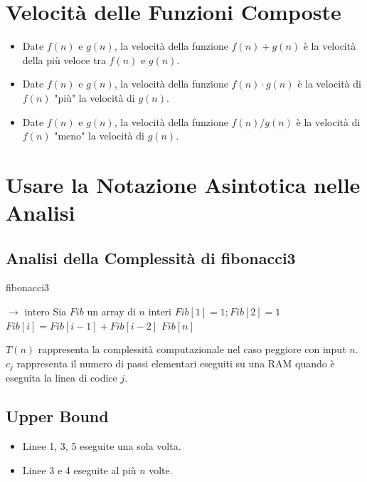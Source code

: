 \documentclass{article}
\begin{document}
\section{Velocità delle Funzioni Composte}

\begin{itemize}
    \item Date $f(n)$ e $g(n)$, la velocità della funzione $f(n) + g(n)$ è la velocità della più veloce tra $f(n)$ e $g(n)$.
    \item Date $f(n)$ e $g(n)$, la velocità della funzione $f(n) \cdot g(n)$ è la velocità di $f(n)$ "più" la velocità di $g(n)$.
    \item Date $f(n)$ e $g(n)$, la velocità della funzione $f(n) / g(n)$ è la velocità di $f(n)$ "meno" la velocità di $g(n)$.
\end{itemize}

\section{Usare la Notazione Asintotica nelle Analisi}

\subsection{Analisi della Complessità di fibonacci3}
\begin{algorithm}
\caption{fibonacci3}
\begin{algorithmic}[1]
 $\rightarrow$ intero
  \State Sia $Fib$ un array di $n$ interi
  \State $Fib[1] = 1; Fib[2] = 1$
    \State $Fib[i] = Fib[i-1] + Fib[i-2]$
  \EndFor
  \State \Return $Fib[n]$
\EndFunction
\end{algorithmic}
\end{algorithm}
$T(n)$ rappresenta la complessità computazionale nel caso peggiore con input $n$. \\ 
$c_j$ rappresenta il numero di passi elementari eseguiti su una RAM quando è eseguita la linea di codice $j$.

\subsection{Upper Bound}
\begin{itemize}
    \item Linee 1, 3, 5 eseguite una sola volta.
    \item Linee 3 e 4 eseguite al più $n$ volte.
\end{itemize}
\end{document}
